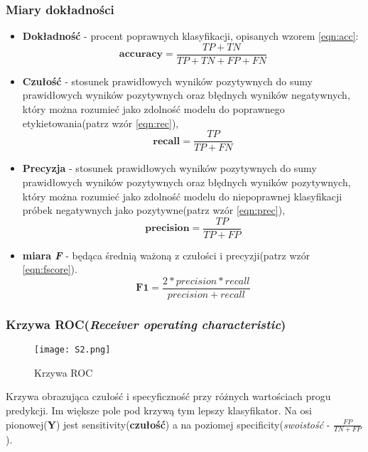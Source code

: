 \subsubsection{Miary dokładności}

\begin{itemize}
	\item \textbf{Dokładność} - procent poprawnych klasyfikacji, opisanych wzorem \ref{eqn:acc}:
	\begin{equation}
	\mathbf{accuracy} = \frac{TP + TN}{TP + TN + FP + FN}
	\label{eqn:acc}
	\end{equation}
	\item \textbf{Czułość} - stosunek prawidłowych wyników pozytywnych do sumy prawidłowych wyników pozytywnych oraz błędnych wyników negatywnych, który można rozumieć jako zdolność modelu do poprawnego etykietowania(patrz wzór \ref{eqn:rec}),
	\begin{equation}
	\mathbf{recall} = \frac{TP}{TP + FN}
	\label{eqn:rec}
	\end{equation}
	\item \textbf{Precyzja} - stosunek prawidłowych wyników pozytywnych do sumy prawidłowych wyników pozytywnych oraz błędnych wyników pozytywnych, który można rozumieć jako zdolność modelu do niepoprawnej klasyfikacji próbek negatywnych jako pozytywne(patrz wzór \ref{eqn:prec}),
	\begin{equation}
	\mathbf{precision} = \frac{TP}{TP + FP}
	\label{eqn:prec}
	\end{equation}
	\item \textbf{miara \textit{F}} - będąca średnią ważoną z czułości i precyzji(patrz wzór \ref{eqn:fscore}).
	\begin{equation}
	\mathbf{F1}= \frac{2 * precision * recall}{precision + recall}
	\label{eqn:fscore}
	\end{equation}
\end{itemize}

\subsubsection{Krzywa ROC(\textit{Receiver operating characteristic})}

\begin{figure}[H]
	\centering
	\texttt{[image: S2.png]}
	\caption{Krzywa ROC}
\end{figure}

Krzywa obrazująca czułość i specyficzność przy różnych wartościach progu predykcji. Im większe pole pod krzywą tym lepszy klasyfikator.  Na osi pionowej(\textbf{Y}) jest sensitivity(\textbf{czułość}) a na poziomej specificity(\textit{swoistość} - $\frac{FP}{TN+FP}$).

